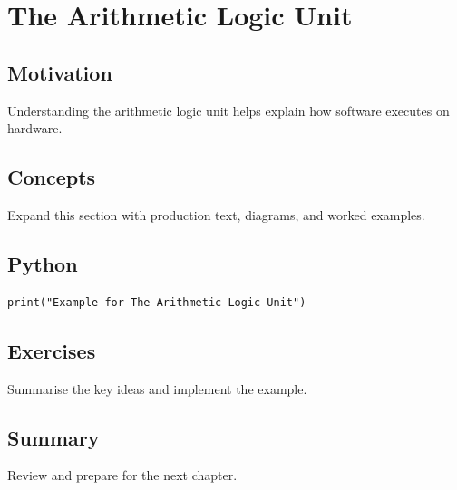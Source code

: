 \chapter{The Arithmetic Logic Unit}
\label{chap:28}



\section{Motivation}
Understanding the arithmetic logic unit helps explain how software executes on hardware.

\section{Concepts}
Expand this section with production text, diagrams, and worked examples.

\section{Python}
\begin{lstlisting}
print("Example for The Arithmetic Logic Unit")
\end{lstlisting}

\section{Exercises}
\begin{exercise}
Summarise the key ideas and implement the example.
\end{exercise}

\section{Summary}
Review and prepare for the next chapter.
